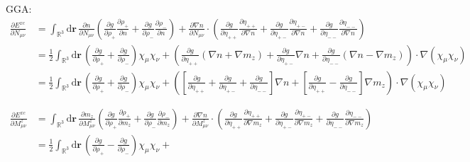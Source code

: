 \documentclass[11pt]{article}
\newcommand{\dd}[1]{\mathrm{d}{#1}\,}
\begin{document}
GGA:
\begin{align}
\frac{\partial E^{xc}}{\partial N_{\mu\nu}} &= \int_{\mathbb{R}^3} \dd{\mathbf{r}} 
  \frac{\partial n}{\partial N_{\mu\nu}}\left( 
      \frac{\partial g}{\partial \rho_+}\frac{\partial\rho_+}{\partial n} +
      \frac{\partial g}{\partial \rho_-}\frac{\partial\rho_-}{\partial n} 
    \right) +
  \frac{\partial \nabla n}{\partial N_{\mu\nu}}\cdot\left(
      \frac{\partial g}{\partial \eta_{++}}\frac{\partial\eta_{++}}{\partial \nabla n} +
      \frac{\partial g}{\partial \eta_{+-}}\frac{\partial\eta_{+-}}{\partial \nabla n} +
      \frac{\partial g}{\partial \eta_{--}}\frac{\partial\eta_{--}}{\partial \nabla n} 
    \right)\nonumber \\
  &= \frac{1}{2}\int_{\mathbb{R}^3} \dd{\mathbf{r}} 
    \left(\frac{\partial g}{\partial \rho_+} + \frac{\partial g}{\partial \rho_-} \right) \chi_\mu \chi_\nu +
    \left(
      \frac{\partial g}{\partial \eta_{++}}(\nabla n + \nabla m_z) +
      \frac{\partial g}{\partial \eta_{+-}}\nabla n +
      \frac{\partial g}{\partial \eta_{--}}(\nabla n - \nabla m_z) 
    \right) \cdot \nabla(\chi_\mu \chi_\nu ) \nonumber \\
  &= \frac{1}{2}\int_{\mathbb{R}^3} \dd{\mathbf{r}} 
    \left(\frac{\partial g}{\partial \rho_+} + \frac{\partial g}{\partial \rho_-} \right) \chi_\mu \chi_\nu +
    \left(
      \left[ \frac{\partial g}{\partial \eta_{++}} + \frac{\partial g}{\partial \eta_{+-}} + \frac{\partial g}{\partial \eta_{--}} \right] \nabla n +
      \left[ \frac{\partial g}{\partial \eta_{++}} - \frac{\partial g}{\partial \eta_{--}} \right] \nabla m_z
    \right) \cdot \nabla(\chi_\mu \chi_\nu ) \\
    \nonumber\\
    \nonumber\\
\frac{\partial E^{xc}}{\partial M^z_{\mu\nu}} &= \int_{\mathbb{R}^3} \dd{\mathbf{r}} 
  \frac{\partial m_z}{\partial M^z_{\mu\nu}}\left( 
      \frac{\partial g}{\partial \rho_+}\frac{\partial\rho_+}{\partial m_z} +
      \frac{\partial g}{\partial \rho_-}\frac{\partial\rho_-}{\partial m_z} 
    \right) +
  \frac{\partial \nabla n}{\partial M^z_{\mu\nu}}\cdot\left(
      \frac{\partial g}{\partial \eta_{++}}\frac{\partial\eta_{++}}{\partial \nabla m_z} +
      \frac{\partial g}{\partial \eta_{+-}}\frac{\partial\eta_{+-}}{\partial \nabla m_z} +
      \frac{\partial g}{\partial \eta_{--}}\frac{\partial\eta_{--}}{\partial \nabla m_z} 
    \right)\nonumber \\
  &= \frac{1}{2}\int_{\mathbb{R}^3} \dd{\mathbf{r}} 
    \left(\frac{\partial g}{\partial \rho_+} - \frac{\partial g}{\partial \rho_-} \right) \chi_\mu \chi_\nu +

\end{align}
\end{document}
